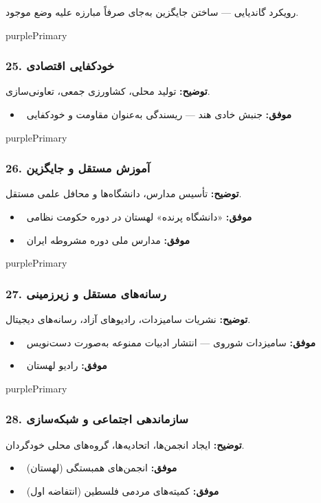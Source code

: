 \documentclass[a4paper,12pt]{article}
\newcommand{\success}[1]{\textcolor{greenPrimary}{\faCheckCircle\ \textbf{موفق:}} #1}
\newcommand{\methodnum}[1]{\textcolor{purpleLight}{\textbf{#1.}}}
\begin{document}
رویکرد گاندیایی — ساختن جایگزین به‌جای صرفاً مبارزه علیه وضع موجود.

\begin{methodcard}{purplePrimary}
\subsubsection{\methodnum{25} خودکفایی اقتصادی}
\textbf{توضیح:} تولید محلی، کشاورزی جمعی، تعاونی‌سازی.

\begin{itemize}[label=\textcolor{greenPrimary}{\faCheckCircle}]
  \item \success{جنبش خادی هند — ریسندگی به‌عنوان مقاومت و خودکفایی}
\end{itemize}
\end{methodcard}

\begin{methodcard}{purplePrimary}
\subsubsection{\methodnum{26} آموزش مستقل و جایگزین}
\textbf{توضیح:} تأسیس مدارس، دانشگاه‌ها و محافل علمی مستقل.

\begin{itemize}[label=\textcolor{greenPrimary}{\faCheckCircle}]
  \item \success{«دانشگاه پرنده» لهستان در دوره حکومت نظامی}
  \item \success{مدارس ملی دوره مشروطه ایران}
\end{itemize}
\end{methodcard}

\begin{methodcard}{purplePrimary}
\subsubsection{\methodnum{27} رسانه‌های مستقل و زیرزمینی}
\textbf{توضیح:} نشریات سامیزدات، رادیوهای آزاد، رسانه‌های دیجیتال.

\begin{itemize}[label=\textcolor{greenPrimary}{\faCheckCircle}]
  \item \success{سامیزدات شوروی — انتشار ادبیات ممنوعه به‌صورت دست‌نویس}
  \item \success{رادیو  لهستان}
\end{itemize}
\end{methodcard}

\begin{methodcard}{purplePrimary}
\subsubsection{\methodnum{28} سازماندهی اجتماعی و شبکه‌سازی}
\textbf{توضیح:} ایجاد انجمن‌ها، اتحادیه‌ها، گروه‌های محلی خودگردان.

\begin{itemize}[label=\textcolor{greenPrimary}{\faCheckCircle}]
  \item \success{انجمن‌های همبستگی (لهستان)}
  \item \success{کمیته‌های مردمی فلسطین (انتفاضه اول)}
\end{itemize}
\end{methodcard}
\end{document}
